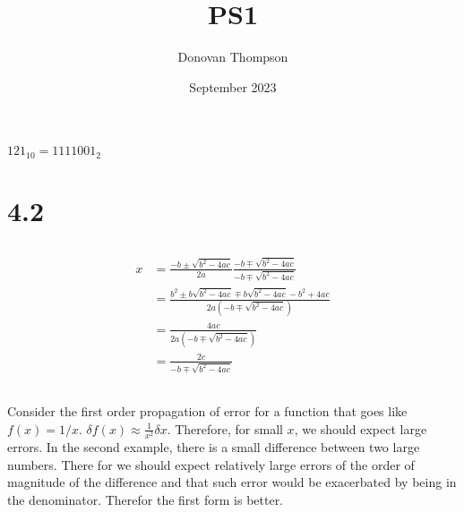 \documentclass{article}
\title{PS1}
\author{Donovan Thompson }
\date{September 2023}
\begin{document}
\maketitle
\section{}
$121_{10}=1111001_{2}$
\section{4.2}
\subsection{}
\begin{align*}
x&=\frac{-b\pm\sqrt{b^2-4ac}}{2a}  \frac{-b\mp\sqrt{b^2-4ac}}{-b\mp\sqrt{b^2-4ac}}\\
&= \frac{b^2\pm b\sqrt{b^2-4ac}\mp b\sqrt{b^2-4ac}-b^2+4ac}{2a\left(-b\mp\sqrt{b^2-4ac} \right)}\\
&= \frac{4ac}{2a\left(-b\mp\sqrt{b^2-4ac}\right)}\\
&= \frac{2c}{-b\mp\sqrt{b^2-4ac}}
\end{align*}
\subsection{}
Consider the first order propagation of error for a function that goes like $f(x)=1/x$. $\delta f(x)\approx \frac{1}{x^2}\delta x $. Therefore, for small $x$, we should expect large errors. In the second example, there is a small difference between two large numbers. There for we should expect relatively large errors of the order of magnitude of the difference and that such error would be exacerbated by being in the denominator. Therefor the first form is better.
\end{document}
